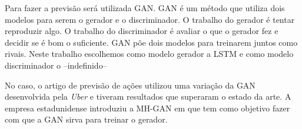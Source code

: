 
Para fazer a previsão será utilizada \acrfull{GAN}. \acrshort{GAN} é um método que utiliza dois modelos para serem o gerador e o discriminador. O trabalho do gerador é tentar reproduzir algo. O trabalho do discriminador é avaliar o que o gerador fez e decidir se é bom o suficiente. \acrshort{GAN} põe dois modelos para treinarem juntos como rivais. Neste trabalho escolhemos como modelo gerador a \acrshort{LSTM} e como modelo discriminador o --indefinido--


No caso, o artigo de previsão de ações utilizou uma variação da \acrshort{GAN} desenvolvida pela \textit{Uber} e tiveram resultados que superaram o estado da arte. A empresa estadunidense introduziu a \acrfull{MH-GAN} em \cite{turner2018metropolis} que tem como objetivo fazer com que a \acrshort{GAN} sirva para treinar o gerador. 

